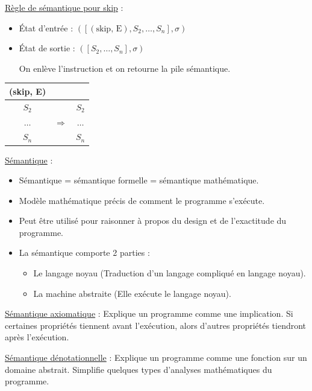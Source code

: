 \documentclass[fr,license=none,skiptoc]{../../../eplsummary}
\begin{document}
\begin{flushleft}
\textcolor{mauvedef}{\underline{Règle de sémantique pour skip}} :

\begin{itemize}
\item État d'entrée : \textcolor{miorangerouge}{$([(\text{skip, E}), S_2, \ldots , S_n ], \sigma )$}
\item État de sortie : \textcolor{miorangerouge}{$([S_2, \ldots , S_n ], \sigma )$}

On enlève l'instruction et on retourne la pile sémantique.
\end{itemize}\bigbreak

\begin{center}
\begin{tabular}{|c|c|c|}
(skip, E) & & \\
\hline
$S_2$ & & $S_2$\\
\hline
$\ldots$ & $\Rightarrow$ & $\ldots$\\
\hline
$S_n$ & & $S_n$\\
\hline
\end{tabular}
\end{center}
\bigbreak



\textcolor{mauvedef}{\underline{Sémantique}} :
\begin{itemize}
\item Sémantique = sémantique formelle = sémantique mathématique.
\item Modèle mathématique précis de comment le programme s'exécute.
\item Peut être utilisé pour raisonner à propos du design et de l'exactitude du programme.
\item La sémantique comporte 2 parties :
\begin{itemize}[label=\textbullet, font=\MEDIUM]
\item Le langage noyau (Traduction d'un langage compliqué en langage noyau).
\item La machine abstraite (Elle exécute le langage noyau).
\end{itemize}
\end{itemize}\bigbreak

\textcolor{mauvedef}{\underline{Sémantique axiomatique}} : Explique un programme comme une implication. Si certaines propriétés tiennent avant l'exécution, alors d'autres propriétés tiendront après l'exécution. \bigbreak

\textcolor{mauvedef}{\underline{Sémantique dénotationnelle}} : Explique un programme comme une fonction sur un domaine abstrait. Simplifie quelques types d'analyses mathématiques du programme. \bigbreak


\end{flushleft}
\end{document}
